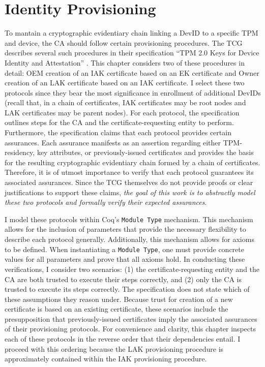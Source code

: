 \documentclass[runningheads]{llncs}
\begin{document}
\section{Identity Provisioning}
To mantain a cryptographic evidentiary chain linking a DevID to a specific TPM and device, the CA should follow certain provisioning procedures. The TCG describes several such procedures in their specification ``TPM 2.0 Keys for Device Identity and Attestation'' \citep{DevIDSpec-TCG}. 
This chapter considers two of these procedures in detail: OEM creation of an IAK certificate based on an EK certificate and Owner creation of an LAK certificate based on an IAK certificate. I select these two protocols since they bear the most significance in enrollment of additional DevIDs (recall that, in a chain of certificates, IAK certificates may be root nodes and LAK certificates may be parent nodes). For each protocol, the specification outlines steps for the CA and the certificate-requesting entity to perform.
Furthermore, the specification claims that each protocol provides certain assurances. Each assurance manifests as an assertion regarding either TPM-residency, key attributes, or previously-issued certificates and provides the basis for the resulting cryptographic evidentiary chain formed by a chain of certificates. Therefore, it is of utmost importance to verify that each protocol guarantees its associated assurances.
Since the TCG themselves do not provide proofs or clear justifications to support these claims, \textit{the goal of this work is to abstractly model these two protocols and formally verify their expected assurances}.


I model these protocols within Coq's \verb|Module Type| mechanism. This mechanism allows for the inclusion of parameters that provide the necessary flexibility to describe each protocol generally. Additionally, this mechanism allows for axioms to be defined. When instantiating a \verb|Module Type|, one must provide concrete values for all parameters and prove that all axioms hold.
In conducting these verifications, I consider two scenarios: (1) the certificate-requesting entity and the CA are both trusted to execute their steps correctly, and (2) only the CA is trusted to execute its steps correctly. The specification does not state which of these assumptions they reason under. 
Because trust for creation of a new certificate is based on an existing certificate, these scenarios include the presupposition that previously-issued certificates imply the associated assurances of their provisioning protocols. For convenience and clarity, this chapter inspects each of these protocols in the reverse order that their dependencies entail. I proceed with this ordering because the LAK provisioning procedure is approximately contained within the IAK provisioning procedure. 
\end{document}
